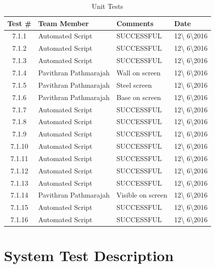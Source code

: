 \documentclass{article}
\begin{document}
\begin{table}[H]
\caption{Unit Tests}
	\begin{tabularx}{\textwidth}{| c | l | X | l |}
	\toprule
	Test \#& Team Member &Comments &Date\\
	\midrule
	7.1.1 & Automated Script  & SUCCESSFUL & 12\textbackslash
	6\textbackslash2016\\
	7.1.2 & Automated Script  & SUCCESSFUL & 12\textbackslash
	6\textbackslash2016\\
	7.1.3 & Automated Script  & SUCCESSFUL & 12\textbackslash
	6\textbackslash2016\\
	7.1.4 & Pavithran Pathmarajah& Wall on screen& 12\textbackslash
	6\textbackslash2016\\
	7.1.5 & Pavithran Pathmarajah& Steel screen & 12\textbackslash
	6\textbackslash2016\\
	7.1.6 & Pavithran Pathmarajah& Base on screen & 12\textbackslash
	6\textbackslash2016\\
	7.1.7 & Automated Script  & SUCCESSFUL & 12\textbackslash
	6\textbackslash2016\\
	7.1.8 & Automated Script  & SUCCESSFUL & 12\textbackslash
	6\textbackslash2016\\
	7.1.9 & Automated Script  & SUCCESSFUL & 12\textbackslash
	6\textbackslash2016\\
	7.1.10 & Automated Script  & SUCCESSFUL & 12\textbackslash
	6\textbackslash2016\\
	7.1.11 & Automated Script  & SUCCESSFUL & 12\textbackslash
	6\textbackslash2016\\
	7.1.12 & Automated Script  & SUCCESSFUL & 12\textbackslash
	6\textbackslash2016\\
	7.1.13 & Automated Script  & SUCCESSFUL & 12\textbackslash
	6\textbackslash2016\\
	7.1.14 & Pavithran Pathmarajah& Visible on screen & 12\textbackslash
	6\textbackslash2016\\
	7.1.15 & Automated Script  & SUCCESSFUL & 12\textbackslash
	6\textbackslash2016\\
	7.1.16 & Automated Script  & SUCCESSFUL & 12\textbackslash
	6\textbackslash2016\\
		\bottomrule
	\end{tabularx}
\end{table}



\section{System Test Description}
\end{document}
